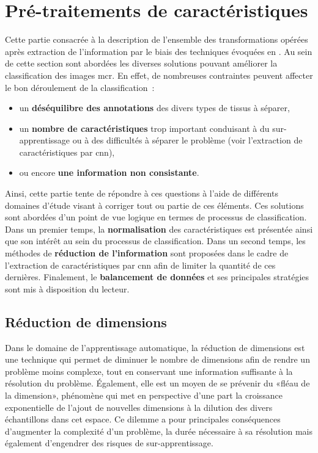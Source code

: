 \clearpage


\section{Pré-traitements de caractéristiques}
Cette partie consacrée à la description de l'ensemble des transformations opérées après extraction de l'information par le biais des techniques évoquées en . Au sein de cette section sont abordées les diverses solutions pouvant améliorer la classification des images \gls{mcr}. En effet, de nombreuses contraintes peuvent affecter le bon déroulement de la classification~:
\begin{itemize}
    \item un \textbf{déséquilibre des annotations} des divers types de tissus à séparer,
    \item un \textbf{nombre de caractéristiques} trop important conduisant à du sur-apprentissage ou à des difficultés à séparer le problème (voir l'extraction de caractéristiques par \gls{cnn}),
    \item ou encore \textbf{une information non consistante}.
\end{itemize}\par

Ainsi, cette partie tente de répondre à ces questions à l'aide de différents domaines d'étude visant à corriger tout ou partie de ces éléments. Ces solutions sont abordées d'un point de vue logique en termes de processus de classification. Dans un premier temps, la \textbf{normalisation} des caractéristiques est présentée ainsi que son intérêt au sein du processus de classification. Dans un second temps, les méthodes de \textbf{réduction de l'information} sont proposées dans le cadre de l'extraction de caractéristiques par \gls{cnn} afin de limiter la quantité de ces dernières. Finalement, le \textbf{balancement de données} et ses principales stratégies sont mis à disposition du lecteur.

\subsection{Réduction de dimensions}
Dans le domaine de l'apprentissage automatique, la réduction de dimensions est une technique qui permet de diminuer le nombre de dimensions afin de rendre un problème moins complexe, tout en conservant une information suffisante à la résolution du problème. Également, elle est un moyen de se prévenir du «fléau de la dimension», phénomène qui met en perspective d'une part la croissance exponentielle de l'ajout de nouvelles dimensions à la dilution des divers échantillons dans cet espace. Ce dilemme a pour principales conséquences d'augmenter la complexité d'un problème, la durée nécessaire à sa résolution mais également d'engendrer des risques de sur-apprentissage.\par

